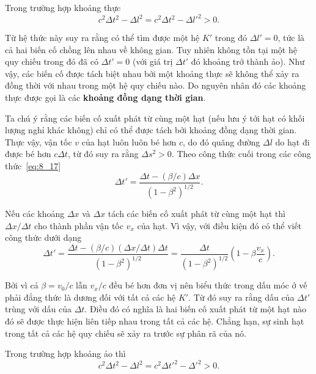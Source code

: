 Trong trường hợp khoảng thực
\begin{equation*}
	c^2\Delta t^2 - \Delta l^2 = c^2\Delta t^2 - \Delta l'^2 > 0.
\end{equation*}

\noindent
Từ hệ thức này suy ra rằng có thể tìm được một hệ $K'$ trong đó $\Delta l'=0$, tức là cả hai biến cố chồng lên nhau về không gian. Tuy nhiên không tồn tại một hệ quy chiếu trong đó đã có $\Delta t'=0$ (với giá trị $\Delta t'$ đó khoảng trở thành ảo). Như vậy, các biến cố được tách biệt nhau bởi một khoảng thực sẽ không thể xảy ra đồng thời với nhau trong một hệ quy chiếu nào. Do nguyên nhân đó các khoảng thực được gọi là các \textbf{khoảng đồng dạng thời gian}.

Ta chú ý rằng các biến cố xuất phát từ cùng một hạt (nếu lưu ý tới hạt có khối lượng nghỉ khác không) chỉ có thể được tách bởi khoảng đồng dạng thời gian. Thực vậy, vận tốc $v$ của hạt luôn luôn bé hơn $c$, do đó quãng đường $\Delta l$ do hạt đi được bé hơn $c \Delta t$, từ đó suy ra rằng $\Delta s^2 > 0$. Theo công thức cuối trong các công thức~\eqref{eq:8_17}
\begin{equation}\label{eq:8_26}
	\Delta t' = \frac{\Delta t - (\beta/c) \Delta x}{\left(1 - \beta^2\right)^{1/2}}.
\end{equation}

\noindent
Nếu các khoảng $\Delta x$ và $\Delta x$ tách các biến cố xuất phát từ cùng một hạt thì $\Delta x/\Delta t$ cho thành phần vận tốc $v_x$ của hạt. Vì vậy, với điều kiện đó có thể viết công thức  dưới dạng
\begin{equation*}
	\Delta t' = \frac{\Delta t - (\beta/c)(\Delta x/\Delta t)\Delta t}{\left(1 - \beta^2\right)^{1/2}} = \frac{\Delta t}{\left(1 - \beta^2\right)^{1/2}}\left(1 - \beta \frac{v_x}{c}\right).
\end{equation*}

\noindent
Bởi vì cả $\beta=v_0/c$ lẫn $v_x/c$ đều bé hơn đơn vị nên biểu thức trong dấu móc ở vế phải đẳng thức là dương đối với tất cả các hệ $K'$. Từ đó suy ra rằng dấu của $\Delta t'$ trùng với dấu của $\Delta t$. Điều đó có nghĩa là hai biến cố xuất phát từ một hạt nào đó sẽ được thực hiện liên tiếp nhau trong tất cả các hệ. Chẳng hạn, sự sinh hạt trong tất cả các hệ quy chiếu sẽ xảy ra trước sự phân rã của nó.

Trong trường hợp khoảng ảo thì
\begin{equation*}
	c^2\Delta t^2 - \Delta l^2 = c^2\Delta t'^2 - \Delta '^2 > 0.
\end{equation*}

